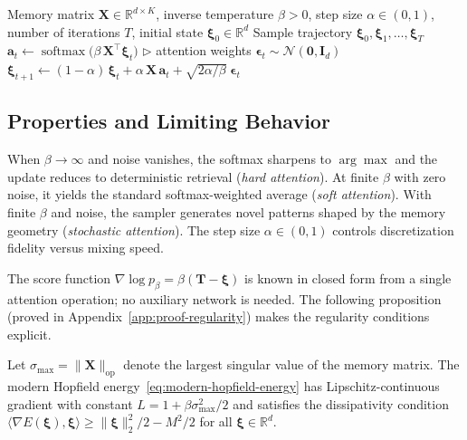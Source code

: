 \begin{algorithm}[t]
\caption{Stochastic Attention Sampler}\label{alg:stochastic-attention}
\begin{algorithmic}[1]
\REQUIRE Memory matrix $\mathbf{X}\in\mathbb{R}^{d\times K}$, inverse temperature $\beta>0$, step size $\alpha\in(0,1)$, number of iterations $T$, initial state $\boldsymbol{\xi}_0\in\mathbb{R}^d$
\ENSURE Sample trajectory $\boldsymbol{\xi}_0,\boldsymbol{\xi}_1,\dots,\boldsymbol{\xi}_T$
    \STATE $\mathbf{a}_t \leftarrow \operatorname{softmax}\!\bigl(\beta\,\mathbf{X}^{\top}\boldsymbol{\xi}_t\bigr)$ \hfill $\triangleright$ attention weights
    \STATE $\boldsymbol{\epsilon}_t \sim \mathcal{N}(\mathbf{0},\mathbf{I}_d)$
    \STATE $\boldsymbol{\xi}_{t+1} \leftarrow (1-\alpha)\,\boldsymbol{\xi}_t + \alpha\,\mathbf{X}\,\mathbf{a}_t + \sqrt{2\alpha/\beta}\;\boldsymbol{\epsilon}_t$
\ENDFOR
\end{algorithmic}
\end{algorithm}

\subsection{Properties and Limiting Behavior}
When $\beta\to\infty$ and noise vanishes, the softmax sharpens to $\arg\max$ and the update reduces to deterministic retrieval (\emph{hard attention}). At finite $\beta$ with zero noise, it yields the standard softmax-weighted average (\emph{soft attention}). With finite $\beta$ and noise, the sampler generates novel patterns shaped by the memory geometry (\emph{stochastic attention}). The step size $\alpha\in(0,1)$ controls discretization fidelity versus mixing speed.

The score function $\nabla\log p_\beta = \beta(\mathbf{T}-\boldsymbol{\xi})$ is known in closed form from a single attention operation; no auxiliary network is needed. The following proposition (proved in Appendix~\ref{app:proof-regularity}) makes the regularity conditions explicit.

\begin{proposition}\label{prop:regularity}
Let $\sigma_{\max}=\|\mathbf{X}\|_{\mathrm{op}}$ denote the largest singular value of the memory matrix. The modern Hopfield energy~\eqref{eq:modern-hopfield-energy} has Lipschitz-continuous gradient with constant $L = 1 + \beta\sigma_{\max}^{2}/2$ and satisfies the dissipativity condition $\langle \nabla E(\boldsymbol{\xi}),\boldsymbol{\xi}\rangle \ge \|\boldsymbol{\xi}\|_2^2/2 - M^2/2$ for all $\boldsymbol{\xi}\in\mathbb{R}^d$.
\end{proposition}

